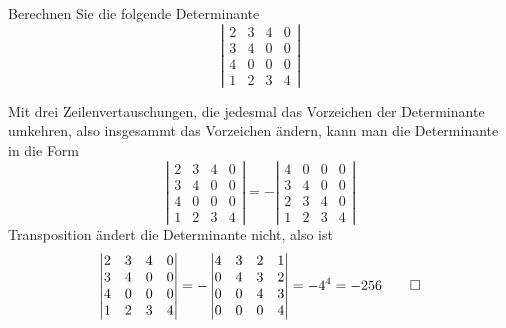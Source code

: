 Berechnen Sie die folgende Determinante
\[
\left|
\begin{matrix}
2&3&4&0\\
3&4&0&0\\
4&0&0&0\\
1&2&3&4
\end{matrix}
\right|
\]


\begin{loesung}
Mit drei Zeilenvertauschungen, die jedesmal das Vorzeichen der
Determinante umkehren, also insgesammt das Vorzeichen ändern,
kann man die Determinante in die Form
\[
\left|
\begin{matrix}
2&3&4&0\\
3&4&0&0\\
4&0&0&0\\
1&2&3&4
\end{matrix}
\right|
=
-\left|
\begin{matrix}
4&0&0&0\\
3&4&0&0\\
2&3&4&0\\
1&2&3&4
\end{matrix}
\right|
\]
Transposition ändert die Determinante nicht, also ist
\[
\left|
\begin{matrix}
2&3&4&0\\
3&4&0&0\\
4&0&0&0\\
1&2&3&4
\end{matrix}
\right|
=
-\left|
\begin{matrix}
4&3&2&1\\
0&4&3&2\\
0&0&4&3\\
0&0&0&4
\end{matrix}
\right|=-4^4=-256
\qedhere
\]
\end{loesung}

